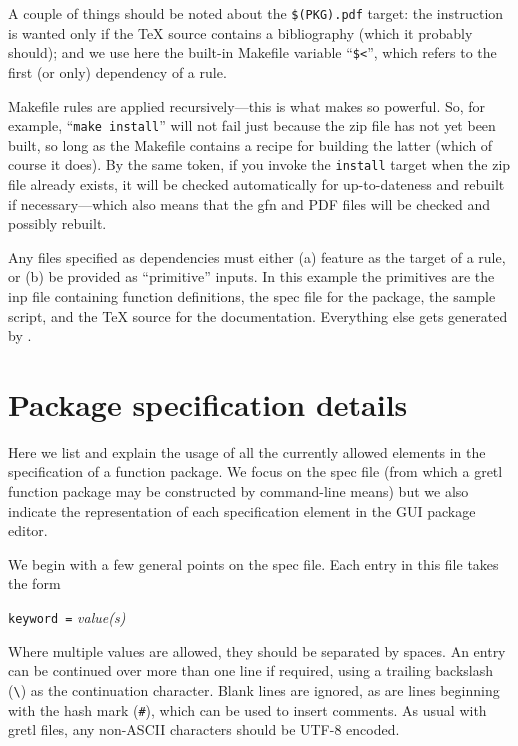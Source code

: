\documentclass[oneside]{book}
\begin{document}
A couple of things should be noted about the \texttt{\$(PKG).pdf}
target: the  instruction is wanted only if the \TeX{}
source contains a bibliography (which it probably should); and we use
here the built-in Makefile variable ``\texttt{\$<}'', which refers to
the first (or only) dependency of a rule.

Makefile rules are applied recursively---this is what makes 
so powerful. So, for example, ``\texttt{make install}'' will not fail
just because the \textsf{zip} file has not yet been built, so long as
the Makefile contains a recipe for building the latter (which of
course it does). By the same token, if you invoke the \texttt{install}
target when the \textsf{zip} file already exists, it will be checked
automatically for up-to-dateness and rebuilt if necessary---which also
means that the \textsf{gfn} and PDF files will be checked and possibly
rebuilt.

Any files specified as dependencies must either (a) feature as the
target of a rule, or (b) be provided as ``primitive'' inputs. In this
example the primitives are the \textsf{inp} file containing function
definitions, the \textsf{spec} file for the package, the sample
script, and the \TeX{} source for the documentation. Everything else
gets generated by .

\chapter{Package specification details}
\label{chap:specfile}

Here we list and explain the usage of all the currently allowed
elements in the specification of a function package. We focus on the
\textsf{spec} file (from which a gretl function package may be
constructed by command-line means) but we also indicate the
representation of each specification element in the GUI package
editor.

We begin with a few general points on the \textsf{spec} file. Each
entry in this file takes the form

\texttt{keyword =} \textsl{value(s)}

Where multiple values are allowed, they should be separated by
spaces. An entry can be continued over more than one line if required,
using a trailing backslash (\verb+\+) as the continuation
character. Blank lines are ignored, as are lines beginning with the
hash mark (\texttt{\#}), which can be used to insert comments.  As
usual with gretl files, any non-ASCII characters should be UTF-8
encoded.
\end{document}
